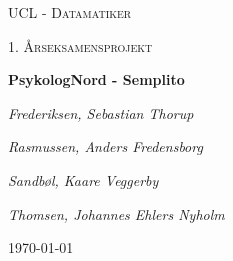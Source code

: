 




\begin{titlepage}
	\centering
	
	{\scshape\LARGE UCL - Datamatiker \par}
	\vspace{1cm}
	{\scshape\Large 1. Årseksamensprojekt\par}
	\vspace{1.5cm}
	{\huge\bfseries PsykologNord - Semplito\par}
	\vspace{2cm}
	{\Large\itshape Frederiksen, Sebastian Thorup\par}
    {\Large\itshape Rasmussen, Anders Fredensborg\par}
	{\Large\itshape Sandbøl, Kaare Veggerby\par}
	{\Large\itshape Thomsen, Johannes Ehlers Nyholm\par}
	\vfill

	\vfill

	{\large \today\par}
\end{titlepage}

\newpage

\clearpage
{}
\tableofcontents

\newpage











{}



